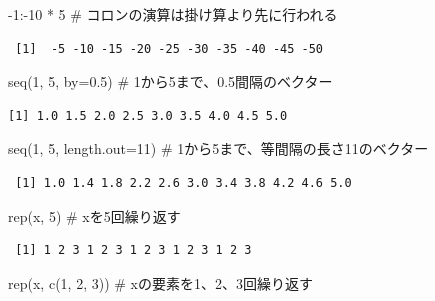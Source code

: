 \documentclass[
  letterpaper,
  DIV=11,
  numbers=noendperiod]{scrreprt}
\newenvironment{Shaded}{\begin{snugshade}}{\end{snugshade}}
\newcommand{\AttributeTok}[1]{\textcolor[rgb]{0.40,0.45,0.13}{#1}}
\newcommand{\CommentTok}[1]{\textcolor[rgb]{0.37,0.37,0.37}{#1}}
\newcommand{\DecValTok}[1]{\textcolor[rgb]{0.68,0.00,0.00}{#1}}
\newcommand{\FloatTok}[1]{\textcolor[rgb]{0.68,0.00,0.00}{#1}}
\newcommand{\FunctionTok}[1]{\textcolor[rgb]{0.28,0.35,0.67}{#1}}
\newcommand{\NormalTok}[1]{\textcolor[rgb]{0.00,0.23,0.31}{#1}}
\newcommand{\SpecialCharTok}[1]{\textcolor[rgb]{0.37,0.37,0.37}{#1}}
\begin{document}
\begin{Shaded}
\begin{Highlighting}[]
\SpecialCharTok{{-}}\DecValTok{1}\SpecialCharTok{:{-}}\DecValTok{10} \SpecialCharTok{*} \DecValTok{5} \CommentTok{\# コロンの演算は掛け算より先に行われる}
\end{Highlighting}
\end{Shaded}

\begin{verbatim}
 [1]  -5 -10 -15 -20 -25 -30 -35 -40 -45 -50
\end{verbatim}

\begin{Shaded}
\begin{Highlighting}[]
\FunctionTok{seq}\NormalTok{(}\DecValTok{1}\NormalTok{, }\DecValTok{5}\NormalTok{, }\AttributeTok{by=}\FloatTok{0.5}\NormalTok{) }\CommentTok{\# 1から5まで、0.5間隔のベクター}
\end{Highlighting}
\end{Shaded}

\begin{verbatim}
[1] 1.0 1.5 2.0 2.5 3.0 3.5 4.0 4.5 5.0
\end{verbatim}

\begin{Shaded}
\begin{Highlighting}[]
\FunctionTok{seq}\NormalTok{(}\DecValTok{1}\NormalTok{, }\DecValTok{5}\NormalTok{, }\AttributeTok{length.out=}\DecValTok{11}\NormalTok{) }\CommentTok{\# 1から5まで、等間隔の長さ11のベクター}
\end{Highlighting}
\end{Shaded}

\begin{verbatim}
 [1] 1.0 1.4 1.8 2.2 2.6 3.0 3.4 3.8 4.2 4.6 5.0
\end{verbatim}

\begin{Shaded}
\begin{Highlighting}[]
\FunctionTok{rep}\NormalTok{(x, }\DecValTok{5}\NormalTok{) }\CommentTok{\# xを5回繰り返す}
\end{Highlighting}
\end{Shaded}

\begin{verbatim}
 [1] 1 2 3 1 2 3 1 2 3 1 2 3 1 2 3
\end{verbatim}

\begin{Shaded}
\begin{Highlighting}[]
\FunctionTok{rep}\NormalTok{(x, }\FunctionTok{c}\NormalTok{(}\DecValTok{1}\NormalTok{, }\DecValTok{2}\NormalTok{, }\DecValTok{3}\NormalTok{)) }\CommentTok{\# xの要素を1、2、3回繰り返す}
\end{Highlighting}
\end{Shaded}
\end{document}

